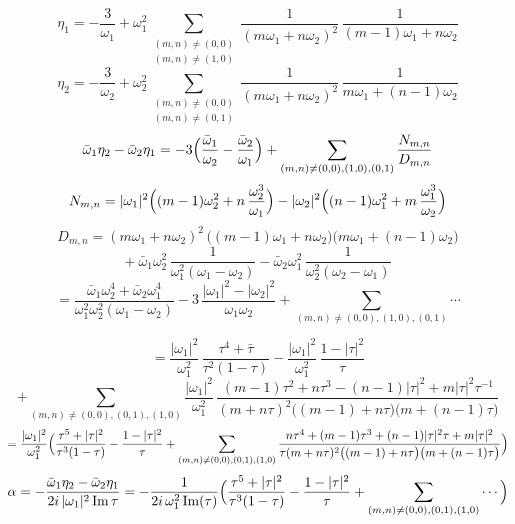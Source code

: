 \documentclass[11pt,a4paper]{article}
\begin{document}
\[
\eta_1 = -\frac{3}{\omega_1} + \omega_1^2
\sum_{\substack{(m,n)\neq(0,0)\\ (m,n)\neq(1,0)}}
\frac{1}{(m\omega_1+n\omega_2)^2}\,\frac{1}{(m-1)\omega_1+n\omega_2}
\]
\[
\eta_2 = -\frac{3}{\omega_2} + \omega_2^2
\sum_{\substack{(m,n)\neq(0,0)\\ (m,n)\neq(0,1)}}
\frac{1}{(m\omega_1+n\omega_2)^2}\,\frac{1}{m\omega_1+(n-1)\omega_2}
\]
\[
\bar\omega_1\eta_2 - \bar\omega_2\eta_1
= -3\Bigl(\frac{\bar\omega_1}{\omega_2} - \frac{\bar\omega_2}{\omega_1}\Bigr)
+ \sum_{(m,n)\neq(0,0),(1,0),(0,1)} \frac{N_{m,n}}{D_{m,n}}
\]
\[
N_{m,n} = |\omega_1|^2\Bigl((m-1)\omega_2^2 + n\,\frac{\omega_2^3}{\omega_1}\Bigr)
- |\omega_2|^2\Bigl((n-1)\omega_1^2 + m\,\frac{\omega_1^3}{\omega_2}\Bigr)
\]
\[
D_{m,n} = (m\omega_1+n\omega_2)^2\,\bigl((m-1)\omega_1+n\omega_2\bigr)
\bigl(m\omega_1+(n-1)\omega_2\bigr)
\]
\[
+\ \bar\omega_1\omega_2^2\,\frac{1}{\omega_1^2(\omega_1-\omega_2)}
- \bar\omega_2\omega_1^2\,\frac{1}{\omega_2^2(\omega_2-\omega_1)}
\]
\[
= \frac{\bar\omega_1\omega_2^4+\bar\omega_2\omega_1^4}{\omega_1^2\omega_2^2(\omega_1-\omega_2)}
- 3\,\frac{|\omega_1|^2-|\omega_2|^2}{\omega_1\omega_2}
+ \sum_{(m,n)\neq(0,0),(1,0),(0,1)}\cdots
\]

\[
= \frac{|\omega_1|^2}{\omega_1^2}\,\frac{\tau^4+\bar\tau}{\tau^2(1-\tau)}
- \frac{|\omega_1|^2}{\omega_1^2}\,\frac{1-|\tau|^2}{\tau}
\]
\[
+ \sum_{(m,n)\neq(0,0),(0,1),(1,0)}\frac{|\omega_1|^2}{\omega_1^2}\,
\frac{(m-1)\tau^2+n\tau^3-(n-1)|\tau|^2+m|\tau|^2\tau^{-1}}
{(m+n\tau)^2\bigl((m-1)+n\tau\bigr)\bigl(m+(n-1)\tau\bigr)}
\]
\[
= \frac{|\omega_1|^2}{\omega_1^2}\Bigl(\frac{\tau^5+|\tau|^2}{\tau^3(1-\tau)}
- \frac{1-|\tau|^2}{\tau}
+ \sum_{(m,n)\neq(0,0),(0,1),(1,0)}
\frac{n\tau^4+(m-1)\tau^3+(n-1)|\tau|^2\tau+m|\tau|^2}
{\tau(m+n\tau)^2\bigl((m-1)+n\tau\bigr)\bigl(m+(n-1)\tau\bigr)}\Bigr)
\]
\[
\alpha = -\frac{\bar\omega_1\eta_2-\bar\omega_2\eta_1}{2i\,|\omega_1|^2\,\mathrm{Im}\,\tau}
= -\frac{1}{2i\,\omega_1^2\,\mathrm{Im}(\tau)}
\Bigl(\frac{\tau^5+|\tau|^2}{\tau^3(1-\tau)} - \frac{1-|\tau|^2}{\tau}
+ \sum_{(m,n)\neq(0,0),(0,1),(1,0)}\cdots\Bigr)
\]
\end{document}
